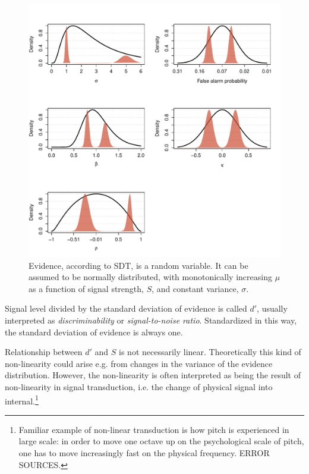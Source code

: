 \documentclass{article}\usepackage{knitr}
\begin{document}
\begin{figure}[!htb]
\begin{center}
\begin{knitrout}
\color{fgcolor}
\includegraphics[width=\maxwidth]{figure/unnamed-chunk-2-1} 

\end{knitrout}
\end{center}
\caption{Evidence, according to SDT, is a random  variable. It can be assumed to be normally distributed, with monotonically increasing $\mu$ as a function of signal strength, $S$, and constant variance, $\sigma$.}
\label{fig:SDT}
\end{figure}

Signal level divided by the standard deviation of evidence is called $d'$, usually interpreted as \textit{discriminability} or \textit{signal-to-noise ratio}. Standardized in this way, the standard deviation of evidence is always one. 

Relationship between $d'$ and $S$ is not necessarily linear. Theoretically this kind of non-linearity could  arise e.g. from changes in the variance of the evidence distribution. However, the non-linearity is often interpreted as being the result of non-linearity in signal transduction, i.e. the change of physical signal into internal.\footnote{Familiar example of non-linear transduction is how pitch is experienced in large scale: in order to move one octave up on the psychological scale of pitch, one has to move increasingly fast on the physical frequency. ERROR SOURCES.}
\end{document}
